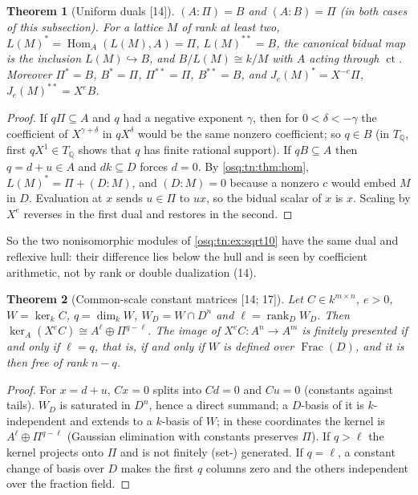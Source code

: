 \documentclass[11pt,letterpaper]{article}
\numberwithin{equation}{section}
\newtheorem{theorem}{Theorem}[section]
\theoremstyle{definition}
\theoremstyle{remark}
\theoremstyle{plain}
\newcommand{\Q}{\mathbb Q}
\newcommand{\ct}{\operatorname{ct}}
\newcommand{\Hom}{\operatorname{Hom}}
\newcommand{\Frac}{\operatorname{Frac}}
\newcommand{\rk}{\operatorname{rank}}
\newcommand{\src}[1]{\textup{\textsf{[#1]}}}
\begin{document}
\begin{theorem}[Uniform duals \src{14}]\label{osq:tn:thm:duals}
$(A:\Pi)=B$ and $(A:B)=\Pi$ (in both cases of this subsection). For a lattice $M$ of rank at least two,
$L(M)^*=\Hom_A(L(M),A)=\Pi$, $L(M)^{**}=B$, the canonical bidual map is the inclusion $L(M)\hookrightarrow B$, and $B/L(M)\cong k/M$ with
$A$ acting through $\ct$. Moreover $\Pi^*=B$, $B^*=\Pi$, $\Pi^{**}=\Pi$, $B^{**}=B$, and $J_e(M)^*=X^{-e}\Pi$, $J_e(M)^{**}=X^eB$.
\end{theorem}
\begin{proof}
If $q\Pi\subseteq A$ and $q$ had a negative exponent $\gamma$, then for $0<\delta<-\gamma$ the coefficient of $X^{\gamma+\delta}$ in $qX^\delta$
would be the same nonzero coefficient; so $q\in B$ (in $T_\Q$, first $qX^1\in T_\Q$ shows that $q$ has finite rational support). If $qB\subseteq A$
then $q=d+u\in A$ and $dk\subseteq D$ forces $d=0$. By \cref{osq:tn:thm:hom}, $L(M)^*=\Pi+(D:M)$, and $(D:M)=0$ because a nonzero $c$ would
embed $M$ in $D$. Evaluation at $x$ sends $u\in\Pi$ to $ux$, so the bidual scalar of $x$ is $x$. Scaling by $X^e$ reverses in the first dual and
restores in the second.
\end{proof}

So the two nonisomorphic modules of \cref{osq:tn:ex:sqrt10} have the same dual and reflexive hull: their difference lies below the hull and is
seen by coefficient arithmetic, not by rank or double dualization (14).

\begin{theorem}[Common-scale constant matrices \src{14; 17}]\label{osq:tn:thm:matrix}
Let $C\in k^{m\times n}$, $e>0$, $W=\ker_kC$, $q=\dim_kW$, $W_D=W\cap D^n$ and $\ell=\rk_DW_D$. Then
$\ker_A(X^eC)\cong A^\ell\oplus\Pi^{q-\ell}$. The image of $X^eC:A^n\to A^m$ is finitely presented if and only if $\ell=q$, that is,
if and only if $W$ is defined over $\Frac(D)$, and it is then free of rank $n-q$.
\end{theorem}
\begin{proof}
For $x=d+u$, $Cx=0$ splits into $Cd=0$ and $Cu=0$ (constants against tails). $W_D$ is saturated in $D^n$, hence a direct summand; a $D$-basis of
it is $k$-independent and extends to a $k$-basis of $W$; in these coordinates the kernel is $A^\ell\oplus\Pi^{q-\ell}$ (Gaussian elimination
with constants preserves $\Pi$). If $q>\ell$ the kernel projects onto $\Pi$ and is not finitely (set-) generated. If $q=\ell$, a constant change of
basis over $D$ makes the first $q$ columns zero and the others independent over the fraction field.
\end{proof}
\end{document}
